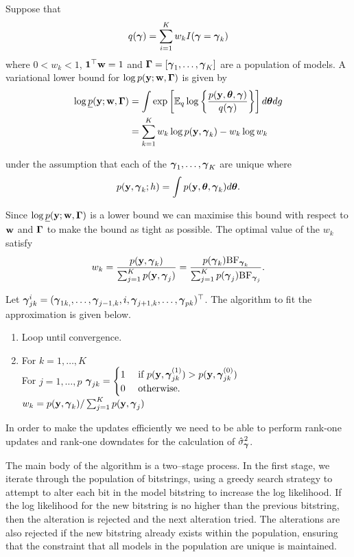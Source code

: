 \documentclass{amsart}[12pt]
\begin{document}
Suppose that
\[
	q({\boldsymbol \gamma}) = \sum_{i=1}^K w_k I({\boldsymbol \gamma} = {\boldsymbol \gamma}_k)
\]
where $0 < w_k < 1$, ${\bf 1}^\top {\bf w} = 1$ and ${\boldsymbol \Gamma} = [{\boldsymbol \gamma}_1, \ldots, {\boldsymbol \gamma}_K]$ are a population of
models. A variational lower bound for $\log p({\bf y}; {\bf w}, {\boldsymbol \Gamma})$ is given by
\begin{align*}
	\log \underline{p}({\bf y}; {\bf w}, {\boldsymbol \Gamma}) &= \int \exp\left[ {\mathbb E}_q \log \left\{ \frac{p({\bf y}, {\boldsymbol \theta}, {\boldsymbol \gamma})}{q({\boldsymbol \gamma})} \right\} \right] d {\boldsymbol \theta} dg \\
	&= \sum_{k=1}^K w_k \log p({\bf y}, {\boldsymbol \gamma}_k) - w_k \log w_k
\end{align*}

under the assumption that each of the ${\boldsymbol \gamma}_1, \ldots, {\boldsymbol \gamma}_K$ are unique where
\[
	p({\bf y}, {\boldsymbol \gamma}_k; h) = \int p({\bf y}, {\boldsymbol \theta}, {\boldsymbol \gamma}_k) d {\boldsymbol \theta}.
\]

Since $\log \underline{p}({\bf y}; {\bf w}, {\boldsymbol \Gamma})$ is a lower bound we can maximise this bound with respect to
${\bf w}$ and ${\boldsymbol \Gamma}$ to make the bound as tight as possible. The optimal value of the $w_k$ satisfy
\begin{align*}
	w_k = \frac{p({\bf y}, {\boldsymbol \gamma}_k)}{\sum_{j=1}^K p({\bf y}, {\boldsymbol \gamma}_j)} = \frac{p({\boldsymbol \gamma}_k) \text{BF}_{{\boldsymbol \gamma}_k}}{\sum_{j=1}^K p({\boldsymbol \gamma}_j) \text{BF}_{{\boldsymbol \gamma}_j}}.
\end{align*}

Let ${\boldsymbol \gamma}_{jk}^{i} = ({\boldsymbol \gamma}_{1k, }, \ldots, {\boldsymbol \gamma}_{j-1, k}, i, {\boldsymbol \gamma}_{j+1, k}, \ldots, {\boldsymbol \gamma}_{pk})^\top$. The algorithm to fit the approximation is given below.
\begin{enumerate}
	\item Loop until convergence.
	\item For $k = 1, \ldots, K$ \\
	For $j = 1, \ldots, p$
	${\boldsymbol \gamma}_{jk} = \begin{cases}
	1 &\text{ if } p({\bf y}, {\boldsymbol \gamma}_{jk}^{(1)}) > p({\bf y}, {\boldsymbol \gamma}_{jk}^{(0)}) \\
	0 & \text{ otherwise}.
	\end{cases}$ \\
	$w_k = p({\bf y}, {\boldsymbol \gamma}_k) / \sum_{j=1}^K p({\bf y}, {\boldsymbol \gamma}_j)$
\end{enumerate}
In order to make the updates efficiently we need to be able to perform rank-one updates and rank-one downdates for the calculation of $\hat{\sigma}_{\boldsymbol \gamma}^2$.

The main body of the algorithm is a two--stage process. In the first stage, we iterate through the population of
bitstrings, using a greedy search strategy to attempt to alter each bit in the model bitstring to increase the log likelihood. If the log likelihood for the new bitstring is no higher than the previous bitstring, then the
alteration is rejected and the next alteration tried. The alterations are also rejected if the new bitstring
already exists within the population, ensuring that the constraint that all models in the population are
unique is maintained.
\end{document}
